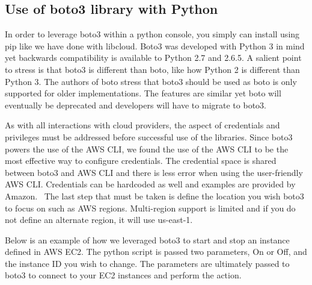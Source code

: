 \subsection{Use of boto3 library with Python}

In order to leverage boto3 within a python console, you simply can install using pip like 
we have done with libcloud. Boto3 was developed with Python 3 in mind yet backwards 
compatibility is available to Python 2.7 and 2.6.5. A salient point to stress is that
boto3 is different than boto, like how Python 2 is different than Python 3. The authors 
of boto stress that boto3 should be used as boto is only supported for older 
implementations. The features are similar yet boto will eventually be deprecated and 
developers will have to migrate to boto3.~\cite{hid-sp18-518-AWS-boto3}

As with all interactions with cloud providers, the aspect of credentials and privileges 
must be addressed before successful use of the libraries. Since boto3 powers the use of
the AWS CLI, we found the use of the AWS CLI to be the most effective way to configure 
credentials. The credential space is shared between boto3 and AWS CLI and there is less 
error when using the user-friendly AWS CLI. Credentials can be hardcoded as well and 
examples are provided by Amazon.~\cite{hid-sp18-518-Boto3} The last step that must be 
taken is define the location you wish boto3 to focus on such as AWS regions. Multi-region 
support is limited and if you do not define an alternate region, it will use us-east-1.

Below is an example of how we leveraged boto3 to start and stop an instance defined in 
AWS EC2. The python script is passed two parameters, On or Off, and the instance ID you
wish to change. The parameters are ultimately passed to boto3 to connect to your EC2 
instances and perform the action.

